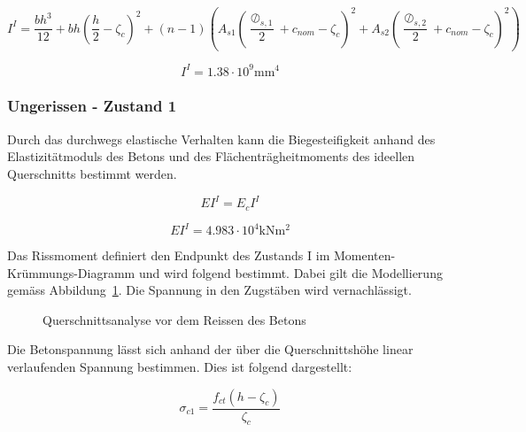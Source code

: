 \documentclass[
  12pt,
  letterpaper,
  egregdoesnotlikesansseriftitles]{scrreprt}
\begin{document}
\begin{equation}I^{I} = \frac{b h^{3}}{12} + b h \left(\frac{h}{2} - \zeta_{c}\right)^{2} + \left(n - 1\right) \left(A_{s 1} \left(\frac{\oslash_{s,1}}{2} + c_{nom} - \zeta_{c}\right)^{2} + A_{s 2} \left(\frac{\oslash_{s,2}}{2} + c_{nom} - \zeta_{c}\right)^{2}\right)\end{equation}

\begin{equation}I^{I} = 1.38 \cdot 10^{9} \text{mm}^{4}\end{equation}

\subsubsection{Ungerissen - Zustand 1}\label{ungerissen---zustand-1-1}

Durch das durchwegs elastische Verhalten kann die Biegesteifigkeit
anhand des Elastizitätmoduls des Betons und des Flächenträgheitmoments
des ideellen Querschnitts bestimmt werden.

\begin{equation}EI^{I} = E_{c} I^{I}\end{equation}

\begin{equation}EI^{I} = 4.983 \cdot 10^{4} \text{kN} \text{m}^{2}\end{equation}

Das Rissmoment definiert den Endpunkt des Zustands I im
Momenten-Krümmungs-Diagramm und wird folgend bestimmt. Dabei gilt die
Modellierung gemäss Abbildung~\ref{fig-qs2_sv14}. Die Spannung in den
Zugstäben wird vernachlässigt.

\begin{figure}[H]


\caption{\label{fig-qs2_sv14}Querschnittsanalyse vor dem Reissen des
Betons}

\end{figure}%

Die Betonspannung lässt sich anhand der über die Querschnittshöhe linear
verlaufenden Spannung bestimmen. Dies ist folgend dargestellt:

\begin{equation}\sigma_{c 1} = \frac{f_{ct} \left(h - \zeta_{c}\right)}{\zeta_{c}}\end{equation}
\end{document}
